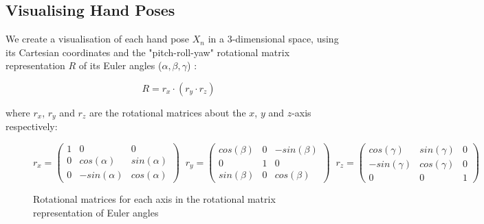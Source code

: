 \documentclass[11pt, a4paper]{report}
\begin{document}
\newpage
\subsection{Visualising Hand Poses}\label{sec:4.3.2}
We create a visualisation of each hand pose $X_n$ in a 3-dimensional space, using its Cartesian coordinates and the "pitch-roll-yaw" rotational matrix representation $R$ of its Euler angles ($\alpha,\beta,\gamma$) \cite{weisstein}:

\begin{equation}
    R=r_x\cdot(r_y\cdot r_z)
\end{equation}

\noindent where $r_x$, $r_y$ and $r_z$ are the rotational matrices about the $x$, $y$ and $z$-axis respectively:

\begin{figure}[H]
    \centering
    \begin{equation*}
        r_x = \begin{pmatrix}1&0&0 \\ 0&cos(\alpha)&sin(\alpha) \\ 0&-sin(\alpha)&cos(\alpha)\end{pmatrix}\;\;
        r_y = \begin{pmatrix}cos(\beta)&0&-sin(\beta) \\ 0&1&0 \\ sin(\beta)&0&cos(\beta)\end{pmatrix}\;\;
        r_z = \begin{pmatrix}cos(\gamma)&sin(\gamma)&0 \\ -sin(\gamma)&cos(\gamma)&0 \\ 0&0&1 \end{pmatrix}
    \end{equation*}
    \caption{Rotational matrices for each axis in the rotational matrix representation of Euler angles}
    \label{fig:4.5}
\end{figure}
\end{document}
